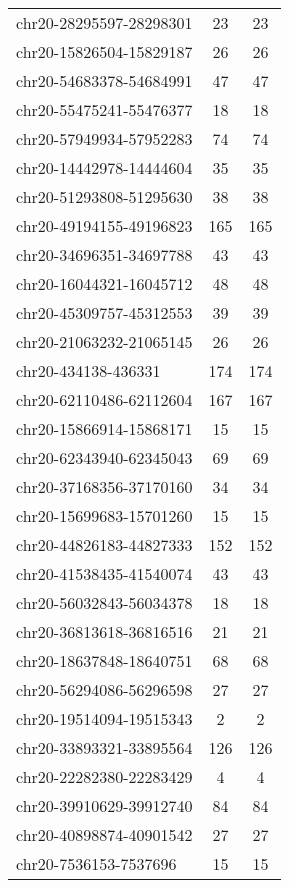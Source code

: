 \documentclass[10pt,letterpaper]{article}
\begin{document}
{\begin{longtable}{lSS}
	chr20-28295597-28298301 & 23     & 23       \\
	chr20-15826504-15829187 & 26     & 26       \\
	chr20-54683378-54684991 & 47     & 47       \\
	chr20-55475241-55476377 & 18     & 18       \\
	chr20-57949934-57952283 & 74     & 74       \\
	chr20-14442978-14444604 & 35     & 35       \\
	chr20-51293808-51295630 & 38     & 38       \\
	chr20-49194155-49196823 & 165    & 165      \\
	chr20-34696351-34697788 & 43     & 43       \\
	chr20-16044321-16045712 & 48     & 48       \\
	chr20-45309757-45312553 & 39     & 39       \\
	chr20-21063232-21065145 & 26     & 26       \\
	chr20-434138-436331     & 174    & 174      \\
	chr20-62110486-62112604 & 167    & 167      \\
	chr20-15866914-15868171 & 15     & 15       \\
	chr20-62343940-62345043 & 69     & 69       \\
	chr20-37168356-37170160 & 34     & 34       \\
	chr20-15699683-15701260 & 15     & 15       \\
	chr20-44826183-44827333 & 152    & 152      \\
	chr20-41538435-41540074 & 43     & 43       \\
	chr20-56032843-56034378 & 18     & 18       \\
	chr20-36813618-36816516 & 21     & 21       \\
	chr20-18637848-18640751 & 68     & 68       \\
	chr20-56294086-56296598 & 27     & 27       \\
	chr20-19514094-19515343 & 2      & 2        \\
	chr20-33893321-33895564 & 126    & 126      \\
	chr20-22282380-22283429 & 4      & 4        \\
	chr20-39910629-39912740 & 84     & 84       \\
	chr20-40898874-40901542 & 27     & 27       \\
	chr20-7536153-7537696   & 15     & 15       \\

\end{longtable}}
\end{document}
